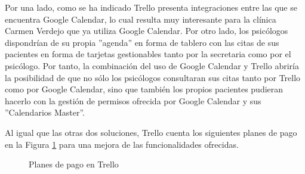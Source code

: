Por una lado, como se ha indicado Trello presenta integraciones entre las que se encuentra Google Calendar, lo cual resulta muy interesante para la clínica Carmen Verdejo que ya utiliza Google Calendar. Por otro lado, los psicólogos dispondrían de su propia ''agenda'' en forma de tablero con las citas de sus pacientes en forma de tarjetas gestionables tanto por la secretaria como por el psicólogo. Por tanto, la combinación del uso de Google Calendar y Trello abriría la posibilidad de que no sólo los psicólogos consultaran sus citas tanto por Trello como por Google Calendar, sino que también los propios pacientes pudieran hacerlo con la gestión de permisos ofrecida por Google Calendar y sus ''Calendarios Master''. \bigskip

Al igual que las otras dos soluciones, Trello cuenta los siguientes planes de pago en la Figura \ref{fig:trello-precios} para una mejora de las funcionalidades ofrecidas. 

\begin{figure}[H]
    \caption{Planes de pago en Trello}
    \label{fig:trello-precios}
\end{figure}

